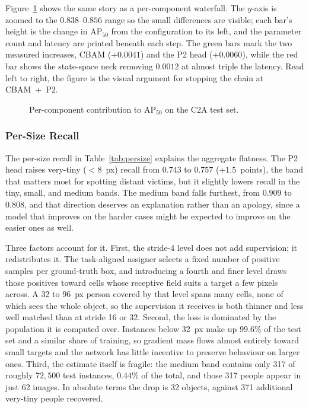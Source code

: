 Figure~\ref{fig:waterfall} shows the same story as a per-component waterfall.
The $y$-axis is zoomed to the $0.838$--$0.856$ range so the small differences
are visible; each bar's height is the change in $\mathrm{AP}_{50}$ from the
configuration to its left, and the parameter count and latency are printed
beneath each step. The green bars mark the two measured increases, CBAM
($+0.0041$) and the P2 head ($+0.0060$), while the red bar shows the
state-space neck removing $0.0012$ at almost triple the latency. Read left to
right, the figure is the visual argument for stopping the chain at
CBAM~+~P2.

\begin{figure}[tbp]
  \centering
  
  \caption{Per-component contribution to $\mathrm{AP}_{50}$ on the C2A test set.}
  \label{fig:waterfall}
\end{figure}

\subsubsection{Per-Size Recall}
The per-size recall in Table~\ref{tab:persize} explains the aggregate
flatness. The P2 head raises very-tiny ($<8$~px) recall from $0.743$ to
$0.757$ ($+1.5$~points), the band that matters most for spotting distant
victims, but it slightly lowers recall in the tiny, small, and medium bands.
The medium band falls furthest, from $0.909$ to $0.808$, and that direction
deserves an explanation rather than an apology, since a model that improves on
the harder cases might be expected to improve on the easier ones as well.

Three factors account for it. First, the stride-4 level does not add supervision;
it redistributes it. The task-aligned assigner selects a fixed number of positive
samples per ground-truth box, and introducing a fourth and finer level draws
those positives toward cells whose receptive field suits a target a few pixels
across. A 32 to 96~px person covered by that level spans many cells, none of
which sees the whole object, so the supervision it receives is both thinner and
less well matched than at stride 16 or 32. Second, the loss is dominated by the
population it is computed over. Instances below 32~px make up $99.6\%$ of the
test set and a similar share of training, so gradient mass flows almost entirely
toward small targets and the network has little incentive to preserve behaviour
on larger ones. Third, the estimate itself is fragile: the medium band contains
only 317 of roughly $72{,}500$ test instances, $0.44\%$ of the total, and those
317 people appear in just 62 images. In absolute terms the drop is 32 objects,
against 371 additional very-tiny people recovered.

